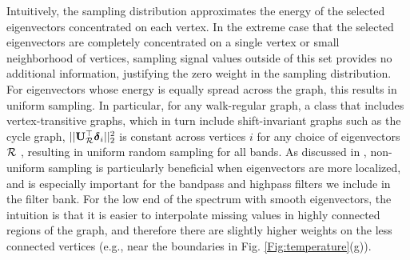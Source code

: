\documentclass[journal, 10pt]{IEEEtran}
\begin{document}
Intuitively, the sampling distribution approximates the energy of the selected eigenvectors concentrated on each vertex. In the extreme case that the selected eigenvectors are completely concentrated on a single vertex or small neighborhood of vertices, sampling signal values outside of this set provides no additional information, justifying the zero weight in the sampling distribution. For eigenvectors whose energy is equally spread across the graph, this results in uniform sampling. In particular, for any walk-regular graph, a class that includes vertex-transitive graphs, which in turn include shift-invariant graphs such as the cycle graph, $||{\bf U}_{{\cal R}}^{\top} {\boldsymbol \delta}_i ||_2^2$ is constant across vertices $i$ for any choice of eigenvectors ${\cal R}$ \cite[Corollary 3.2]{chan1997symmetry}, resulting in uniform random sampling for all bands. %
As discussed in \cite[Section 5.1.2]{PuyTGV15}, non-uniform sampling is particularly beneficial when eigenvectors are more localized, and is especially important for the bandpass and highpass filters we include in the filter bank. For the low end of the spectrum with smooth eigenvectors, the intuition is that it is easier to interpolate missing values in highly connected regions of the graph, and therefore there are slightly higher weights on the less connected vertices (e.g., near the boundaries in Fig. \ref{Fig:temperature}(g)).
%
\end{document}
